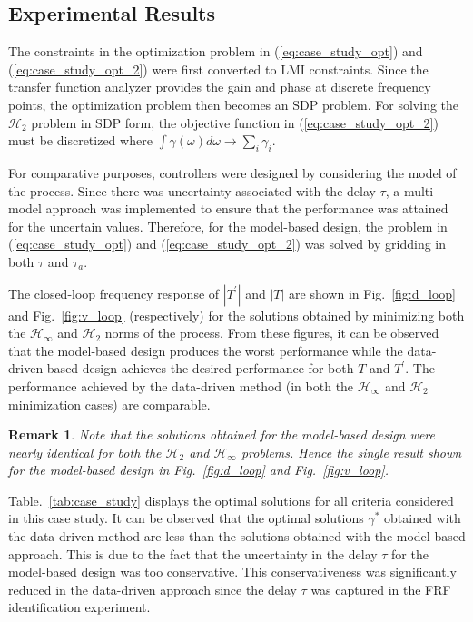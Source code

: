 \documentclass[a4paper, 10pt, conference]{ieeeconf}
\newtheorem*{remark}{Remark}
\begin{document}
\subsection{Experimental Results}
The constraints in the optimization problem in (\ref{eq:case_study_opt}) and (\ref{eq:case_study_opt_2}) were first converted to LMI constraints. Since the transfer function analyzer provides the gain and phase at discrete frequency points, the optimization problem then becomes an SDP problem. For solving the $\mathcal{H}_2$ problem in SDP form, the objective function in (\ref{eq:case_study_opt_2}) must be discretized where $\int \gamma(\omega) d\omega \rightarrow \sum_i \gamma_i$.

For comparative purposes, controllers were designed by considering the model of the process.  Since there was uncertainty associated with the delay $\tau$, a multi-model approach was implemented to ensure that the performance was attained for the uncertain values. Therefore, for the model-based design, the problem in (\ref{eq:case_study_opt}) and (\ref{eq:case_study_opt_2}) was solved by gridding in both $\tau$ and $\tau_{a}$.

The closed-loop frequency response of $|T^{\prime}|$ and $|T|$ are shown in Fig.~\ref{fig:d_loop} and Fig.~\ref{fig:v_loop} (respectively) for the solutions obtained by minimizing both the $\mathcal{H}_{\infty}$ and $\mathcal{H}_2$ norms of the process. From these figures, it can be observed that the model-based design produces the worst performance while the data-driven based design achieves the desired performance for both $T$ and $T^{\prime}$. The performance achieved by the data-driven method (in both the $\mathcal{H}_{\infty}$ and $\mathcal{H}_2$ minimization cases) are comparable. 

\begin{remark}
Note that the solutions obtained for the model-based design were nearly identical for both the $\mathcal{H}_2$ and $\mathcal{H}_\infty$ problems. Hence the single result shown for the model-based design in Fig.~\ref{fig:d_loop} and Fig.~\ref{fig:v_loop}. 
\end{remark}

Table.~\ref{tab:case_study} displays the optimal solutions for all criteria considered in this case study. It can be observed that the optimal solutions $\gamma^*$ obtained with the data-driven method are less than the solutions obtained with the model-based approach. This is due to the fact that the uncertainty in the delay $\tau$ for the model-based design was too conservative. This conservativeness was significantly reduced in the data-driven approach since the delay $\tau$ was captured in the FRF identification experiment. 
\end{document}
